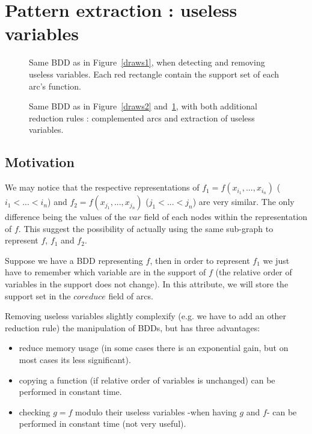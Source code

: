 \documentclass[a4paper,10pt]{article}
\newcommand{\includeframe}[4]{\makebox[#2\linewidth]{\texttt{[image: \#4]}}}
\begin{document}
\section{Pattern extraction : useless variables}
\begin{figure}
\centering
\includeframe{3}{1}{}{draws.pdf}
\caption{Same BDD as in Figure~\ref{draws1}, when detecting and removing useless variables. Each red rectangle contain the support set of each arc's function.}
\label{draws3}
\end{figure}


\begin{figure}
\centering
\includeframe{4}{1}{}{draws.pdf}
\caption{Same BDD as in Figure~\ref{draws2} and~\ref{draws3}, with both additional reduction rules : complemented arcs and extraction of useless variables.}
\label{draws4}
\end{figure}

\subsection{Motivation}
We may notice that the respective representations of $f_1 = f(x_{i_1}, ..., x_{i_n})$ ($i_1 < ... < i_n$) and $f_2 = f(x_{j_1}, ..., x_{j_n})$ ($j_1 < ... < j_n$) are very similar.
The only difference being the values of the $var$ field of each nodes within the representation of $f$.
This suggest the possibility of actually using the same sub-graph to represent $f$, $f_1$ and $f_2$.


Suppose we have a BDD representing $f$, then in order to represent $f_1$ we just have to remember which variable are in the support of $f$ (the relative order of variables in the support does not change).
In this attribute, we will store the support set in the $coreduce$ field of arcs.

Removing useless variables slightly complexify (e.g. we have to add an other reduction rule) the manipulation of BDDs, but has three advantages:\begin{itemize}
\item reduce memory usage (in some cases there is an exponential gain, but on most cases its less significant).
\item copying a function (if relative order of variables is unchanged) can be performed in constant time.
\item checking $g = f$ modulo their useless variables -when having $g$ and $f$- can be performed in constant time (not very useful).
\end{itemize}
\end{document}
